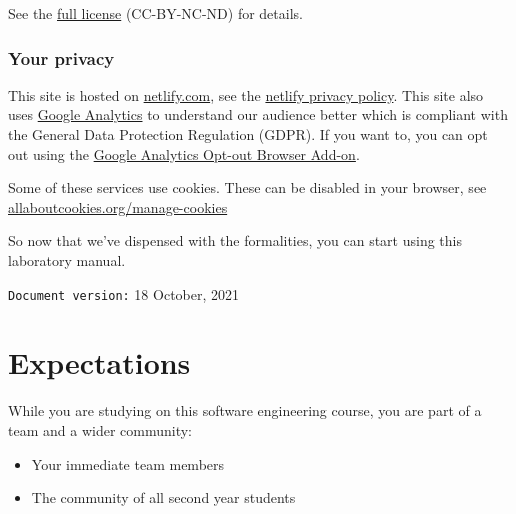 \documentclass[
]{book}
\providecommand{\tightlist}{%
  \setlength{\itemsep}{0pt}\setlength{\parskip}{0pt}}
\begin{document}
See the \href{https://creativecommons.org/licenses/by-nc-nd/3.0/}{full license} (CC-BY-NC-ND) for details.

\hypertarget{privacy}{%
\subsection{Your privacy}\label{privacy}}

This site is hosted on \href{https://www.netlify.com/}{netlify.com}, see the \href{https://www.netlify.com/privacy/}{netlify privacy policy}. This site also uses \href{https://en.wikipedia.org/wiki/Google_Analytics}{Google Analytics} to understand our audience better which is compliant with the General Data Protection Regulation (GDPR). If you want to, you can opt out using the \href{https://tools.google.com/dlpage/gaoptout/}{Google Analytics Opt-out Browser Add-on}.

Some of these services use cookies. These can be disabled in your browser, see \href{https://www.allaboutcookies.org/manage-cookies/}{allaboutcookies.org/manage-cookies}

So now that we've dispensed with the formalities, you can start using this laboratory manual.





































\texttt{Document\ version:} 18 October, 2021

\hypertarget{expectations}{%
\chapter*{Expectations}\label{expectations}}

While you are studying on this software engineering course, you are part of a team and a wider community:

\begin{itemize}
\tightlist
\item
  Your immediate team members
\item
  The community of all second year students
\end{itemize}
\end{document}
